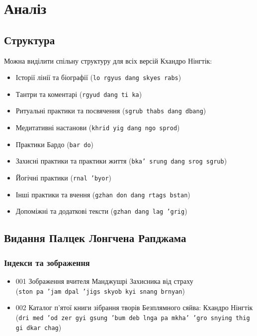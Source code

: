 \documentclass{article}
\begin{document}
\section{Аналіз}

\subsection{Структура}

Можна виділити спільну структуру для всіх версій Кхандро Нінгтік:

\begin{itemize}
\item Історії лінії та біографії (\texttt{lo rgyus dang skyes rabs})
\item Тантри та коментарі (\texttt{rgyud dang ti ka})
\item Ритуальні практики та посвячення (\texttt{sgrub thabs dang dbang})
\item Медитативні настанови (\texttt{khrid yig dang ngo sprod})
\item Практики Бардо (\texttt{bar do})
\item Захисні практики та практики життя (\texttt{bka' srung dang srog sgrub})
\item Йогічні практики (\texttt{rnal 'byor})
\item Інші практики та вчення (\texttt{gzhan don dang rtags bstan})
\item Допоміжні та додаткові тексти (\texttt{gzhan dang lag 'grig})
\end{itemize}

\newpage
\subsection{Видання Палцек Лонгчена Рапджама}

\subsubsection{Індекси та зображення}

\begingroup\raggedright
\begin{itemize}
\item 001 Зображення вчителя Манджушрі Захисника від страху \\ (\texttt{ston pa 'jam dpal 'jigs skyob kyi snang brnyan})
\item 002 Каталог п'ятої книги зібрання творів Безплямного сяйва: Кхандро Нінгтік \\ (\texttt{dri med 'od zer gyi gsung 'bum deb lnga pa mkha' 'gro snying thig gi dkar chag})
\end{itemize}
\endgroup
\end{document}
